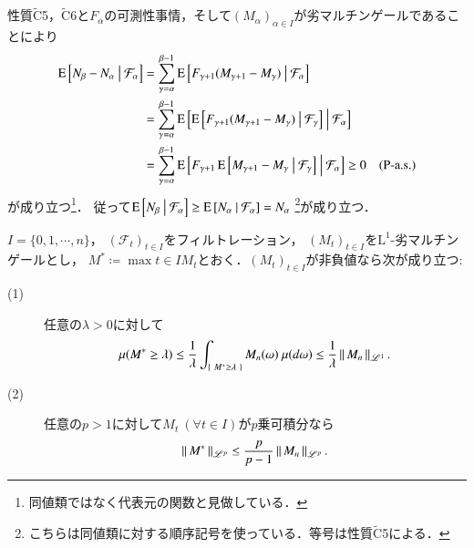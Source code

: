 \begin{prf}
\begin{description}
\begin{description}
						性質$\tilde{\mathrm{C}}$5，$\tilde{\mathrm{C}}$6と$F_\alpha$の可測性事情，そして$(M_\alpha)_{\alpha \in I}$が劣マルチンゲールであることにより
						\begin{align}
							\operatorname{E} \left[ N_{\beta} - N_{\alpha} \ \middle|\ \mathcal{F}_\alpha \right]
							&= \sum_{\gamma=\alpha}^{\beta-1} \operatorname{E} \left[ F_{\gamma+1}(M_{\gamma+1} - M_\gamma) \ \middle|\ \mathcal{F}_\alpha \right] \\
							&= \sum_{\gamma=\alpha}^{\beta-1} \operatorname{E} \left[ \operatorname{E} \left[ F_{\gamma+1}(M_{\gamma+1} - M_\gamma) \ \middle|\ \mathcal{F}_\gamma \right] \ \middle|\ \mathcal{F}_\alpha \right] \\
							&= \sum_{\gamma=\alpha}^{\beta-1} \operatorname{E} \left[ F_{\gamma+1}\operatorname{E} \left[ M_{\gamma+1} - M_\gamma \ \middle|\ \mathcal{F}_\gamma \right] \ \middle|\ \mathcal{F}_\alpha \right]
							\geq 0\quad (\mbox{P-a.s.})
						\end{align}
						が成り立つ\footnote{同値類ではなく代表元の関数と見做している．}．
						従って$\operatorname{E} \left[ N_{\beta} \ \middle|\ \mathcal{F}_\alpha \right] \geq \operatorname{E} \left[ N_{\alpha} \ \middle|\ \mathcal{F}_\alpha \right] = N_\alpha$
						\footnote{こちらは同値類に対する順序記号を使っている．等号は性質$\tilde{\mathrm{C}}$5による．}が成り立つ．
				\end{description}
				
		\end{description}
	\end{prf}

	\begin{itembox}[l]{}
		\begin{thm}[Doobの不等式(1)]
			$I=\{0,1,\cdots,n\}$，
			$(\mathcal{F}_t)_{t \in I}$をフィルトレーション，
			$(M_t)_{t \in I}$を$\mathrm{L}^1$-劣マルチンゲールとし，
			$M^* \coloneqq \max{t \in I}{M_t}$とおく．$(M_t)_{t \in I}$が非負値なら次が成り立つ:
			\begin{description}
				\item[(1)] 任意の$\lambda > 0$に対して
					\begin{align}
						\mu(M^* \geq \lambda) \leq \frac{1}{\lambda} \int_{\left\{\ M^* \geq \lambda\ \right\}} M_n(\omega)\ \mu(d\omega)
						\leq \frac{1}{\lambda} \left\|\, M_n\, \right\|_{\mathscr{L}^1}.
					\end{align}
				\item[(2)] 任意の$p > 1$に対して$M_t\ (\forall t \in I)$が$p$乗可積分なら
					\begin{align}
						\left\|\, M^*\, \right\|_{\mathscr{L}^p} \leq \frac{p}{p-1} \left\|\, M_n\, \right\|_{\mathscr{L}^p}.
					\end{align}
			\end{description}
		\end{thm}
	\end{itembox}
	
